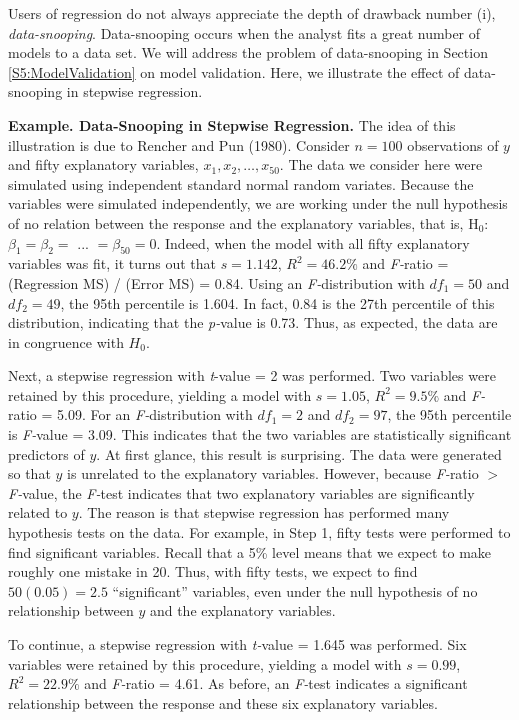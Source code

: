 Users of regression do not always appreciate the depth of drawback
number (i), \textit{data-snooping}. Data-snooping occurs when the
analyst fits a great number of models to a data set. We will address
the problem of data-snooping in Section \ref{S5:ModelValidation} on
model validation. Here, we illustrate the effect of data-snooping in
stepwise regression.

\linejed

\textbf{Example. Data-Snooping in Stepwise Regression.} The idea of
this illustration is due to Rencher and Pun (1980). Consider $n=100$
observations of $y$ and fifty explanatory variables, $x_1, x_2,
\ldots,x_{50}$. The data we consider here were simulated using
independent standard normal random variates. Because the variables
were simulated independently, we are working under the null
hypothesis of no relation between the response and the explanatory
variables, that is, H$_{0}$: $\beta _{1}=\beta _{2}=$ $...$ $=\beta
_{50}=0$. Indeed, when the model with all
fifty explanatory variables was fit, it turns out that $s=1.142$, $%
R^{2}=46.2\%$ and \textit{F-}ratio = (Regression MS) / (Error MS) =
0.84. Using an \textit{F-}distribution with $df_{1}=50$ and
$df_{2}=49$, the 95th percentile is 1.604. In fact, 0.84 is the 27th
percentile of this distribution, indicating that the
\textit{p-}value is 0.73. Thus, as expected, the data are in
congruence with $H_0$.

Next, a stepwise regression with \textit{t}-value = 2 was performed. Two
variables were retained by this procedure, yielding a model with $s=1.05$, $%
R^{2}=9.5\%$ and \textit{F-}ratio = 5.09. For an
\textit{F-}distribution with $df_{1}=2$ and $df_{2}=97$, the 95th
percentile is \textit{F-}value = 3.09. This indicates that the two
variables are statistically significant predictors of $y$. At first
glance, this result is surprising. The data were generated so
that $y$ is unrelated to the explanatory variables. However, because \textit{%
F-}ratio $>$ \textit{F-}value, the \textit{F-}test indicates that
two explanatory variables are significantly related to $y$. The
reason is that stepwise regression has performed many hypothesis
tests on the data. For example, in Step 1, fifty tests were
performed to find significant variables. Recall that a 5\% level
means that we expect to make roughly one mistake in 20. Thus, with
fifty tests, we expect to find $50(0.05)=2.5$ ``significant''
variables, even under the null hypothesis of no relationship between
$y$ and the explanatory variables.

To continue, a stepwise regression with \textit{t-}value = 1.645 was
performed. Six variables were retained by this procedure, yielding a
model with $s=0.99$, $R^{2}=22.9\%$ and \textit{F-}ratio = 4.61. As
before, an \textit{F-}test indicates a significant relationship
between the response and these six explanatory variables.


